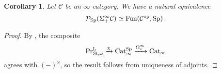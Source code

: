 \documentclass[10pt]{amsart}
\numberwithin{equation}{section}
\newtheorem{cor}[prop]{Corollary}
\theoremstyle{definition}
\DeclareMathOperator{\Fun}{Fun}
\DeclareMathOperator{\op}{op}
\DeclareMathOperator{\St}{St}
\renewcommand{\Pr}{\mathrm{Pr}}
\newcommand{\rL}{\mathrm{L}}
\newcommand{\Cat}{\mathrm{Cat}\vphantom{t}}
\newcommand{\cC}{\mathcal{C}}
\newcommand{\cP}{\mathcal{P}}
\newcommand{\Sp}{\mathrm{Sp}\vphantom{p}}
\begin{document}
\begin{cor}\label{cor:presheaves_on_SigmaC}
	Let $\cC$ be an $\infty$-category.
  We have a natural equivalence
	\begin{align*}
		\cP_{\Sp}(\Sigma^{\infty}_{+}\cC) \simeq \Fun(\cC^{\op},\Sp) \,.
	\end{align*}
\end{cor}
\begin{proof}
	By , the composite
	\begin{align*}
		\Pr^{\rL}_{\St,\omega} \xrightarrow{\chi} \Cat_{\infty}^{\Sp} \xrightarrow{\Omega^{\infty}_{*}} \Cat_{\infty}
	\end{align*}
	agrees with $(-)^{\omega}$, so the result follows from uniqueness of adjoints.
\end{proof}
\end{document}
